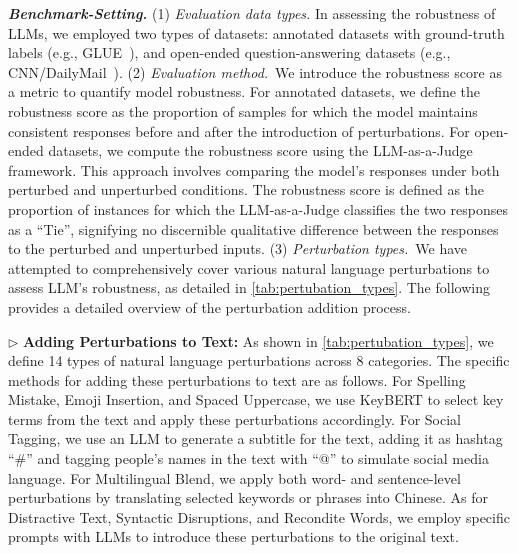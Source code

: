 \textbf{\textit{Benchmark-Setting.}}
(1) \textit{Evaluation data types.} In assessing the robustness of LLMs, we employed two types of datasets: annotated datasets with ground-truth labels (e.g., GLUE~\cite{wang2018glue}), and open-ended question-answering datasets (e.g., CNN/DailyMail~\cite{hermann2015teaching}).
(2) \textit{Evaluation method.}~We introduce the robustness score as a metric to quantify model robustness. For annotated datasets, we define the robustness score as the proportion of samples for which the model maintains consistent responses before and after the introduction of perturbations. For open-ended datasets, we compute the robustness score using the LLM-as-a-Judge framework. This approach involves comparing the model’s responses under both perturbed and unperturbed conditions. The robustness score is defined as the proportion of instances for which the LLM-as-a-Judge classifies the two responses as a ``Tie'', signifying no discernible qualitative difference between the responses to the perturbed and unperturbed inputs.
(3) \textit{Perturbation types.}~We have attempted to comprehensively cover various natural language perturbations to assess LLM's robustness, as detailed in \autoref{tab:pertubation_types}. The following provides a detailed overview of the perturbation addition process.

\begin{tcolorbox}[details]
\small
    $\triangleright$ \textbf{Adding Perturbations to Text:}  As shown in \autoref{tab:pertubation_types}, we define 14 types of natural language perturbations across 8 categories. The specific methods for adding these perturbations to text are as follows. For Spelling Mistake, Emoji Insertion, and Spaced Uppercase, we use KeyBERT to select key terms from the text and apply these perturbations accordingly. For Social Tagging, we use an LLM to generate a subtitle for the text, adding it as hashtag ``\#'' and tagging people’s names in the text with ``@'' to simulate social media language. For Multilingual Blend, we apply both word- and sentence-level perturbations by translating selected keywords or phrases into Chinese. As for Distractive Text, Syntactic Disruptions, and Recondite Words, we employ specific prompts with LLMs to introduce these perturbations to the original text.
\end{tcolorbox}

